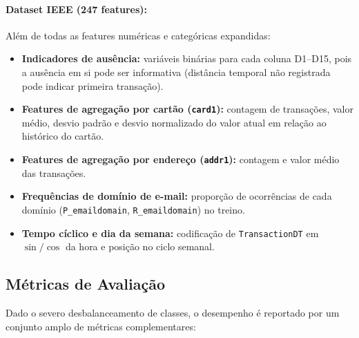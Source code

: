 \documentclass[12pt,a4paper]{article}
\begin{document}
\paragraph{Dataset IEEE (247 features):}
Além de todas as features numéricas e categóricas expandidas:
\begin{itemize}[nosep]
  \item \textbf{Indicadores de ausência:} variáveis binárias para cada coluna
    D1--D15, pois a ausência em si pode ser informativa (distância temporal não
    registrada pode indicar primeira transação).
  \item \textbf{Features de agregação por cartão (\texttt{card1}):} contagem de
    transações, valor médio, desvio padrão e desvio normalizado do valor atual
    em relação ao histórico do cartão.
  \item \textbf{Features de agregação por endereço (\texttt{addr1}):} contagem
    e valor médio das transações.
  \item \textbf{Frequências de domínio de e-mail:} proporção de ocorrências de
    cada domínio (\texttt{P\_emaildomain}, \texttt{R\_emaildomain}) no treino.
  \item \textbf{Tempo cíclico e dia da semana:} codificação de \texttt{TransactionDT}
    em $\sin/\cos$ da hora e posição no ciclo semanal.
\end{itemize}

\subsection{Métricas de Avaliação}
\label{sec:metricas}

Dado o severo desbalanceamento de classes, o desempenho é reportado por um
conjunto amplo de métricas complementares:
\end{document}
